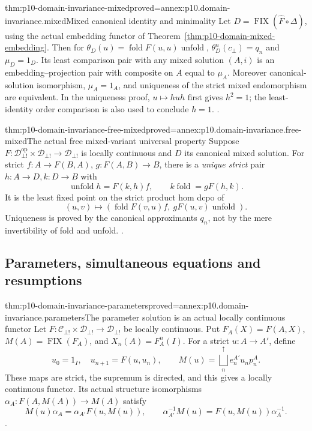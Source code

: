\begin{hbtheorem}{thm:p10-domain-invariance-mixed}{proved=annex:p10.domain-invariance.mixed}{Mixed canonical identity and minimality}
Let \(D=\operatorname{FIX}(\widehat F\circ\Delta)\), using the
actual embedding functor of Theorem~\ref{thm:p10-domain-mixed-embedding}.
Then for \(\theta_D(u)=\operatorname{fold}F(u,u)\operatorname{unfold}\),
\(\theta_D^n(c_{\bot})=q_n\) and \(\mu_D=1_D\).
Its least comparison pair with any mixed solution \((A,i)\)
is an embedding--projection pair with composite on \(A\) equal
to \(\mu_A\). Moreover canonical-solution isomorphism,
\(\mu_A=1_A\), and uniqueness of the strict mixed endomorphism
are equivalent. In the uniqueness proof, \(u\mapsto huh\)
first gives \(h^2=1\); the least-identity order comparison is
also used to conclude \(h=1\).
\cite[Theorems~5.3.7--8, pp.~78--79]
{AbramskyJungCorrectedExpandedDomainTheory}.
\end{hbtheorem}

\begin{hbtheorem}{thm:p10-domain-invariance-free-mixed}{proved=annex:p10.domain-invariance.free-mixed}{The actual free mixed-variant universal property}
Suppose \(F:\mathcal D_{\bot!}^{\mathrm{op}}\times
\mathcal D_{\bot!}\to\mathcal D_{\bot!}\) is locally
continuous and \(D\) its canonical mixed solution. For strict
\(f:A\to F(B,A)\), \(g:F(A,B)\to B\), there is a
\emph{unique strict} pair \(h:A\to D,k:D\to B\) with
\[
 \operatorname{unfold}h=F(k,h)f,\qquad
 k\operatorname{fold}=gF(h,k).
\]
It is the least fixed point on the strict product hom dcpo of
\[
 (u,v)\longmapsto
 (\operatorname{fold}F(v,u)f,\ gF(u,v)\operatorname{unfold}).
\]
Uniqueness is proved by the canonical approximants \(q_n\),
not by the mere invertibility of fold and unfold.
\cite[Theorem~5.3.9, p.~79]{AbramskyJungCorrectedExpandedDomainTheory}.
\end{hbtheorem}

\subsection{Parameters, simultaneous equations and resumptions}

\begin{hbtheorem}{thm:p10-domain-invariance-parameters}{proved=annex:p10.domain-invariance.parameters}{The parameter solution is an actual locally continuous functor}
Let \(F:\mathcal C_{\bot!}\times\mathcal D_{\bot!}\to
\mathcal D_{\bot!}\) be locally continuous. Put
\(F_A(X)=F(A,X)\), \(M(A)=\operatorname{FIX}(F_A)\), and
\(X_n(A)=F_A^n(I)\). For a strict \(u:A\to A'\), define
\[
 u_0=1_I,\quad u_{n+1}=F(u,u_n),\qquad
 M(u)=\bigsqcup_n^{\uparrow}e_n^{A'}u_np_n^A.
\]
These maps are strict, the supremum is directed, and this gives
a locally continuous functor. Its actual structure isomorphisms
\(\alpha_A:F(A,M(A))\to M(A)\) satisfy
\[
 M(u)\alpha_A=\alpha_{A'}F(u,M(u)),\qquad
 \alpha_{A'}^{-1}M(u)=F(u,M(u))\alpha_A^{-1}.
\]
\cite[Proposition~5.2.7, pp.~73--74]
{AbramskyJungCorrectedExpandedDomainTheory}.
\end{hbtheorem}

